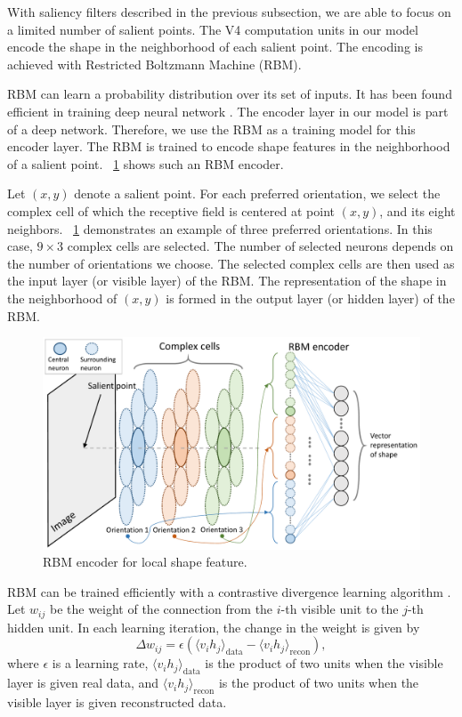 \documentclass[5p]{elsarticle}
\begin{document}
With saliency filters described in the previous subsection,
we are able to focus on a limited number of salient points.
The V4 computation units in our model encode the shape in the neighborhood of each salient point.
The encoding is achieved with Restricted Boltzmann Machine (RBM).

RBM can learn a probability distribution over its set of inputs.
It has been found efficient in training deep neural network \cite{hinton2006}.
The encoder layer in our model is part of a deep network.
Therefore, we use the RBM as a training model for this encoder layer.
The RBM is trained to encode shape features in the neighborhood of a salient point.
\figurename~\ref{fig:6} shows such an RBM encoder.


Let $(x,y)$ denote a salient point.
For each preferred orientation, 
we select the complex cell of which the receptive field is centered at point $(x,y)$,
and its eight neighbors.
\figurename~\ref{fig:6} demonstrates an example of three preferred orientations.
In this case, $9\times3$ complex cells are selected.
The number of selected neurons depends on the number of orientations we choose.
The selected complex cells are then used as the input layer (or visible layer) of the RBM.
The representation of the shape in the neighborhood of $(x,y)$
is formed in the output layer (or hidden layer) of the RBM.

\begin{figure}
\centerline{\includegraphics[width=0.99\linewidth]{images/fig-6.pdf}} 
\caption{RBM encoder for local shape feature.}
\label{fig:6}
\end{figure}

RBM can be trained efficiently with a contrastive divergence learning algorithm \cite{hinton2002}.
Let $w_{ij}$ be the weight of the connection from the $i$-th visible unit to the $j$-th hidden unit.
In each learning iteration, the change in the weight is given by
\begin{equation}
\Delta w_{ij}=\epsilon\left(\langle v_i h_j\rangle_\text{data}-\langle v_i h_j\rangle_\text{recon}\right),
\end{equation}
where $\epsilon$ is a learning rate, 
$\langle v_i h_j\rangle_\text{data}$ is the product of two units when the visible layer is given real data,
and $\langle v_i h_j\rangle_\text{recon}$ is the product of two units 
when the visible layer is given reconstructed data.
\end{document}
